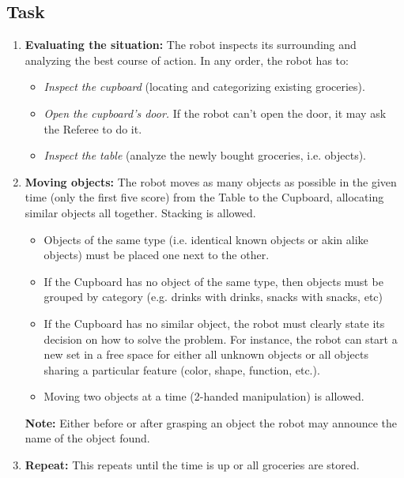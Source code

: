 \subsection{Task}
\begin{enumerate}
	\item \textbf{Evaluating the situation:} The robot inspects its surrounding and analyzing the best course of action. In any order, the robot has to:
	\begin{itemize}
		\item \textit{Inspect the cupboard} (locating and categorizing existing groceries).
		\item \textit{Open the cupboard's door.} If the robot can't open the door, it may ask the Referee to do it.
		\item \textit{Inspect the table} (analyze the newly bought groceries, i.e. objects).
	\end{itemize}

	\item \textbf{Moving objects:} The robot moves as many objects as possible in the given time
	(only the first five score)
	from the Table to the Cupboard, allocating similar objects all together.
	Stacking is allowed.
	\begin{itemize}
		\item Objects of the same type (i.e. identical known objects or akin alike objects) must be placed one next to the other.
		\item If the Cupboard has no object of the same type, then objects must be grouped by category (e.g. drinks with drinks, snacks with snacks, etc)
		\item If the Cupboard has no similar object, the robot must clearly state its decision on how to solve the problem. For instance, the robot can start a new set in a free space for either all unknown objects or all objects sharing a particular feature (color, shape, function, etc.).
		\item Moving two objects at a time (2-handed manipulation) is allowed.
	\end{itemize}

	\textbf{Note:} Either before or after grasping an object the robot may announce the name of the object found.
	\item \textbf{Repeat:} This repeats until the time is up or all groceries are stored.
\end{enumerate}


%
%
